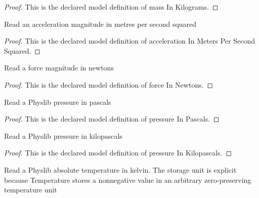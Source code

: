 \begin{proof}
  This is the declared model definition of mass In Kilograms.
\end{proof}
\begin{definition}
  \label{def:physics:phyx-mini-0447:phyxminiproblems-problemphyxmini0447-accelerationinmeterspersecondsquared}
  Read an acceleration magnitude in metres per second squared
\end{definition}
\begin{proof}
  This is the declared model definition of acceleration In Meters Per Second Squared.
\end{proof}
\begin{definition}
  \label{def:physics:phyx-mini-0447:phyxminiproblems-problemphyxmini0447-forceinnewtons}
  Read a force magnitude in newtons
\end{definition}
\begin{proof}
  This is the declared model definition of force In Newtons.
\end{proof}
\begin{definition}
  \label{def:physics:phyx-mini-0447:phyxminiproblems-problemphyxmini0447-pressureinpascals}
  Read a Physlib pressure in pascals
\end{definition}
\begin{proof}
  This is the declared model definition of pressure In Pascals.
\end{proof}
\begin{definition}
  \label{def:physics:phyx-mini-0447:phyxminiproblems-problemphyxmini0447-pressureinkilopascals}
  Read a Physlib pressure in kilopascals
\end{definition}
\begin{proof}
  This is the declared model definition of pressure In Kilopascals.
\end{proof}
\begin{definition}
  \label{def:physics:phyx-mini-0447:phyxminiproblems-problemphyxmini0447-temperatureinkelvin}
  Read a Physlib absolute temperature in kelvin. The storage unit is explicit because Temperature stores a nonnegative value in an arbitrary zero-preserving temperature unit
\end{definition}
